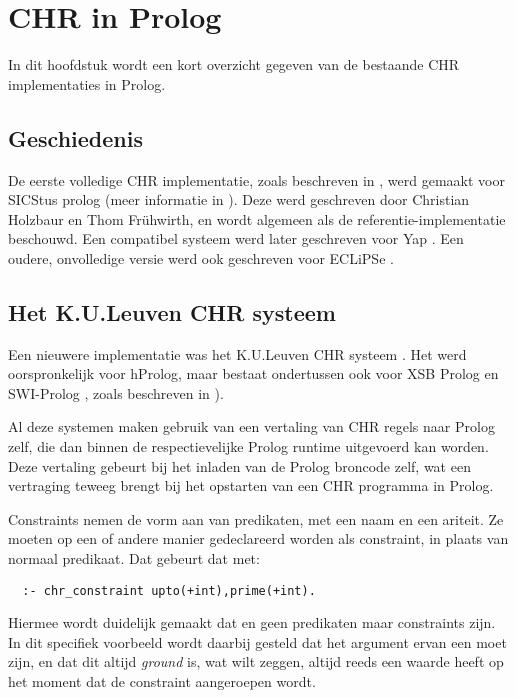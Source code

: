 \chapter{CHR in Prolog}

In dit hoofdstuk wordt een kort overzicht gegeven van de bestaande CHR implementaties in Prolog.

\section{Geschiedenis}

De eerste volledige CHR implementatie, zoals beschreven in \cite{christian:system}, werd gemaakt voor SICStus prolog (meer informatie in \cite{sicstus}). Deze werd geschreven door Christian Holzbaur en Thom Fr\"uhwirth, en wordt algemeen als de referentie-implementatie beschouwd. Een compatibel systeem werd later geschreven voor Yap \cite{yap}. Een oudere, onvolledige versie werd ook geschreven voor ECLiPSe \cite{eclipse}.

\section{Het K.U.Leuven CHR systeem}

Een nieuwere implementatie was het K.U.Leuven CHR systeem \cite{tom:kulchr}. Het werd oorspronkelijk voor hProlog, maar bestaat ondertussen ook voor XSB Prolog \cite{xsb} en SWI-Prolog \cite{swiprolog}, zoals beschreven in \cite{tom:swi:wclp2005}).

Al deze systemen maken gebruik van een vertaling van CHR regels naar Prolog zelf, die dan binnen de respectievelijke Prolog runtime uitgevoerd kan worden. Deze vertaling gebeurt bij het inladen van de Prolog broncode zelf, wat een vertraging teweeg brengt bij het opstarten van een CHR programma in Prolog.

Constraints nemen de vorm aan van predikaten, met een naam en een ariteit. Ze moeten op een of andere manier gedeclareerd worden als constraint, in plaats van normaal predikaat. Dat gebeurt dat met: \begin{Verbatim}
  :- chr_constraint upto(+int),prime(+int).
\end{Verbatim}
Hiermee wordt duidelijk gemaakt dat  en  geen predikaten maar constraints zijn. In dit specifiek voorbeeld wordt daarbij gesteld dat het argument ervan een  moet zijn, en dat dit altijd {\em ground} is, wat wilt zeggen, altijd reeds een waarde heeft op het moment dat de constraint aangeroepen wordt.

